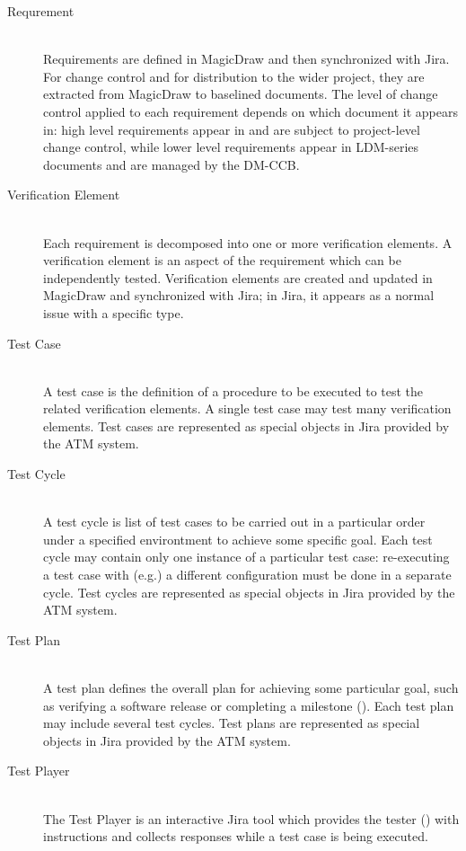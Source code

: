 \begin{description}

\item[Requrement] \hfill \\
Requirements are defined in MagicDraw and then synchronized with Jira.
For change control and for distribution to the wider project, they are extracted from MagicDraw to baselined documents.
The level of change control applied to each requirement depends on which document it appears in: high level requirements appear in  and are subject to project-level change control, while lower level requirements appear in LDM-series documents and are managed by the DM-CCB.

\item[Verification Element] \hfill \\
Each requirement is decomposed into one or more verification elements.
A verification element is an aspect of the requirement which can be independently tested.
Verification elements are created and updated in MagicDraw and synchronized with Jira; in Jira, it appears as a normal issue with a specific type.

\item[Test Case] \hfill \\
A test case is the definition of a procedure to be executed to test the related verification elements.
A single test case may test many verification elements.
Test cases are represented as special objects in Jira provided by the ATM system.

\item[Test Cycle] \hfill \\
A test cycle is list of test cases to be carried out in a particular order under a specified environtment to achieve some specific goal.
Each test cycle may contain only one instance of a particular test case: re-executing a test case with (e.g.) a different configuration must be done in a separate cycle.
Test cycles are represented as special objects in Jira provided by the ATM system.

\item[Test Plan] \hfill \\
A test plan defines the overall plan for achieving some particular goal, such as verifying a software release or completing a milestone ().
Each test plan may include several test cycles.
Test plans are represented as special objects in Jira provided by the ATM system.

\item[Test Player] \hfill\\
The Test Player is an interactive Jira tool which provides the tester () with instructions and collects responses while a test case is being executed.


\end{description}
